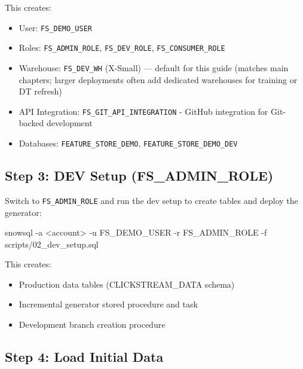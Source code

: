 \documentclass[
  letterpaper,
  DIV=11,
  numbers=noendperiod]{scrreprt}
\newenvironment{Shaded}{\begin{snugshade}}{\end{snugshade}}
\newcommand{\AttributeTok}[1]{\textcolor[rgb]{0.40,0.45,0.13}{#1}}
\newcommand{\ExtensionTok}[1]{\textcolor[rgb]{0.00,0.23,0.31}{#1}}
\newcommand{\NormalTok}[1]{\textcolor[rgb]{0.00,0.23,0.31}{#1}}
\newcommand{\OperatorTok}[1]{\textcolor[rgb]{0.37,0.37,0.37}{#1}}
\providecommand{\tightlist}{%
  \setlength{\itemsep}{0pt}\setlength{\parskip}{0pt}}\usepackage{longtable,booktabs,array}
\begin{document}
This creates:

\begin{itemize}
\tightlist
\item
  User: \texttt{FS\_DEMO\_USER}
\item
  Roles: \texttt{FS\_ADMIN\_ROLE}, \texttt{FS\_DEV\_ROLE},
  \texttt{FS\_CONSUMER\_ROLE}
\item
  Warehouse: \texttt{FS\_DEV\_WH} (X-Small) --- default for this guide
  (matches main chapters; larger deployments often add dedicated
  warehouses for training or DT refresh)
\item
  API Integration: \texttt{FS\_GIT\_API\_INTEGRATION} - GitHub
  integration for Git-backed development
\item
  Databases: \texttt{FEATURE\_STORE\_DEMO},
  \texttt{FEATURE\_STORE\_DEMO\_DEV}
\end{itemize}

\hypertarget{step-3-dev-setup-fs_admin_role}{%
\subsection{Step 3: DEV Setup
(FS\_ADMIN\_ROLE)}\label{step-3-dev-setup-fs_admin_role}}

Switch to \texttt{FS\_ADMIN\_ROLE} and run the dev setup to create
tables and deploy the generator:

\begin{Shaded}
\begin{Highlighting}[]
\ExtensionTok{snowsql} \AttributeTok{{-}a} \OperatorTok{\textless{}}\NormalTok{account}\OperatorTok{\textgreater{}}\NormalTok{ {-}u FS\_DEMO\_USER }\AttributeTok{{-}r}\NormalTok{ FS\_ADMIN\_ROLE }\AttributeTok{{-}f}\NormalTok{ scripts/02\_dev\_setup.sql}
\end{Highlighting}
\end{Shaded}

This creates:

\begin{itemize}
\tightlist
\item
  Production data tables (CLICKSTREAM\_DATA schema)
\item
  Incremental generator stored procedure and task
\item
  Development branch creation procedure
\end{itemize}

\hypertarget{step-4-load-initial-data}{%
\subsection{Step 4: Load Initial Data}\label{step-4-load-initial-data}}
\end{document}
